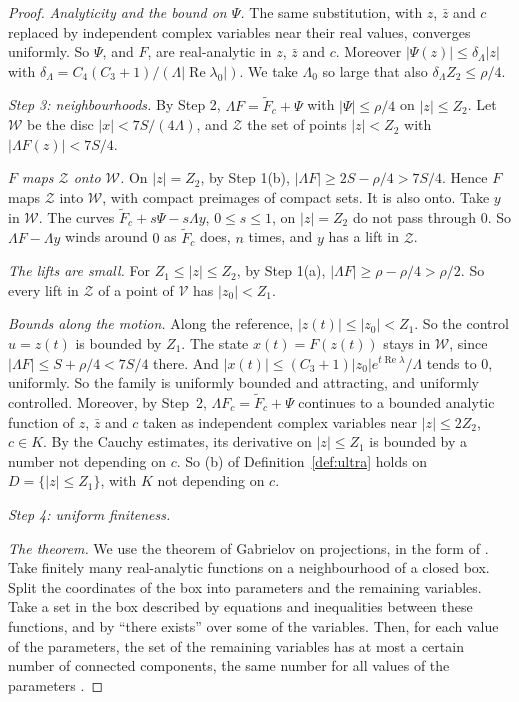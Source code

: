 \documentclass[11pt,reqno]{amsart}
\theoremstyle{plain}
\theoremstyle{definition}
\theoremstyle{remark}
\begin{document}
\begin{proof}
\emph{Analyticity and the bound on $\Psi$.} The same substitution, with $z$, $\bar z$ and $c$ replaced by independent complex variables near their real values, converges uniformly. So $\Psi$, and $F$, are real-analytic in $z$, $\bar z$ and $c$. Moreover $|\Psi(z)|\le\delta_\Lambda|z|$ with $\delta_\Lambda=C_4(C_3+1)/(\Lambda|\operatorname{Re}\lambda_0|)$. We take $\Lambda_0$ so large that also $\delta_\Lambda Z_2\le\rho/4$.

\emph{Step 3: neighbourhoods.} By Step 2, $\Lambda F=\tilde F_c+\Psi$ with $|\Psi|\le\rho/4$ on $|z|\le Z_2$. Let $\mathcal W$ be the disc $|x|<7S/(4\Lambda)$, and $\mathcal Z$ the set of points $|z|<Z_2$ with $|\Lambda F(z)|<7S/4$.

\emph{$F$ maps $\mathcal Z$ onto $\mathcal W$.} On $|z|=Z_2$, by Step 1(b), $|\Lambda F|\ge2S-\rho/4>7S/4$. Hence $F$ maps $\mathcal Z$ into $\mathcal W$, with compact preimages of compact sets. It is also onto. Take $y$ in $\mathcal W$. The curves $\tilde F_c+s\Psi-s\Lambda y$, $0\le s\le1$, on $|z|=Z_2$ do not pass through $0$. So $\Lambda F-\Lambda y$ winds around $0$ as $\tilde F_c$ does, $n$ times, and $y$ has a lift in $\mathcal Z$.

\emph{The lifts are small.} For $Z_1\le|z|\le Z_2$, by Step 1(a), $|\Lambda F|\ge\rho-\rho/4>\rho/2$. So every lift in $\mathcal Z$ of a point of $\mathcal V$ has $|z_0|<Z_1$.

\emph{Bounds along the motion.} Along the reference, $|z(t)|\le|z_0|<Z_1$. So the control $u=z(t)$ is bounded by $Z_1$. The state $x(t)=F(z(t))$ stays in $\mathcal W$, since $|\Lambda F|\le S+\rho/4<7S/4$ there. And $|x(t)|\le(C_3+1)|z_0|e^{t\operatorname{Re}\lambda}/\Lambda$ tends to $0$, uniformly. So the family is uniformly bounded and attracting, and uniformly controlled. Moreover, by Step~2, $\Lambda F_c=\tilde F_c+\Psi$ continues to a bounded analytic function of $z$, $\bar z$ and $c$ taken as independent complex variables near $|z|\le2Z_2$, $c\in K$. By the Cauchy estimates, its derivative on $|z|\le Z_1$ is bounded by a number not depending on $c$. So (b) of Definition~\ref{def:ultra} holds on $D=\{|z|\le Z_1\}$, with $K$ not depending on $c$.

\emph{Step 4: uniform finiteness.}

\emph{The theorem.} We use the theorem of Gabrielov \cite{Gabrielov1968} on projections, in the form of \cite{DenefvdDries1988,vdDries1998}. Take finitely many real-analytic functions on a neighbourhood of a closed box. Split the coordinates of the box into parameters and the remaining variables. Take a set in the box described by equations and inequalities between these functions, and by ``there exists'' over some of the variables. Then, for each value of the parameters, the set of the remaining variables has at most a certain number of connected components, the same number for all values of the parameters \cite[Ch.~3]{vdDries1998}.


\end{proof}
\end{document}
